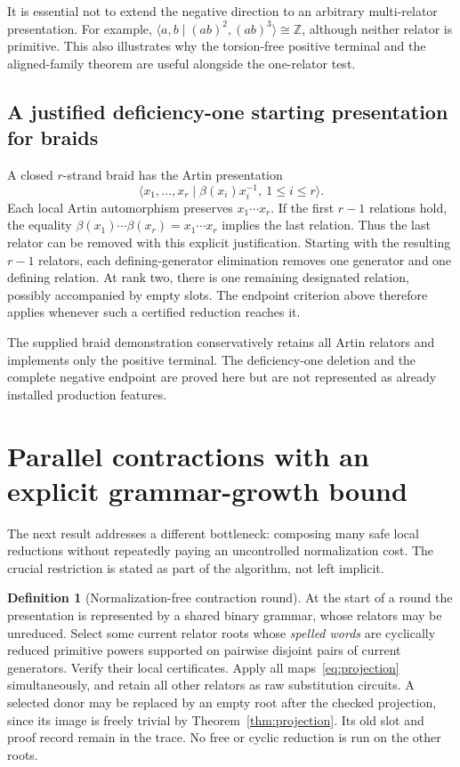 \documentclass[11pt,letterpaper]{article}
\theoremstyle{definition}
\newtheorem{definition}[theorem]{Definition}
\newcommand{\Z}{\mathbb Z}
\begin{document}
It is essential not to extend the negative direction to an arbitrary
multi-relator presentation. For example,
$\langle a,b\mid (ab)^2,(ab)^3\rangle\cong\Z$, although neither relator is
primitive. This also illustrates why the torsion-free positive terminal
and the aligned-family theorem are useful alongside the one-relator test.

\subsection{A justified deficiency-one starting presentation for braids}
A closed $r$-strand braid has the Artin presentation
\[
 \langle x_1,\ldots,x_r\mid \beta(x_i)x_i^{-1},\ 1\leq i\leq r\rangle.
\]
Each local Artin automorphism preserves $x_1\cdots x_r$. If the first $r-1$
relations hold, the equality
$\beta(x_1)\cdots\beta(x_r)=x_1\cdots x_r$ implies the last relation.
Thus the last relator can be removed with this explicit justification.
Starting with the resulting $r-1$ relators, each defining-generator
elimination removes one generator and one defining relation. At rank two,
there is one remaining designated relation, possibly accompanied by empty
slots. The endpoint criterion above therefore applies whenever such a
certified reduction reaches it.

The supplied braid demonstration conservatively retains all Artin relators
and implements only the positive terminal. The deficiency-one deletion and
the complete negative endpoint are proved here but are not represented as
already installed production features.

\section{Parallel contractions with an explicit grammar-growth bound}
\label{sec:rounds}
The next result addresses a different bottleneck: composing many safe local
reductions without repeatedly paying an uncontrolled normalization cost.
The crucial restriction is stated as part of the algorithm, not left implicit.

\begin{definition}[Normalization-free contraction round]
At the start of a round the presentation is represented by a shared binary
grammar, whose relators may be unreduced. Select some current relator roots
whose \emph{spelled words} are cyclically reduced primitive powers supported
on pairwise disjoint pairs of current generators. Verify their local
certificates. Apply all maps~\eqref{eq:projection} simultaneously, and retain
all other relators as raw substitution circuits. A selected donor may be
replaced by an empty root after the checked projection, since its image is
freely trivial by Theorem~\ref{thm:projection}. Its old slot and proof record
remain in the trace. No free or cyclic reduction is run on the other roots.
\end{definition}
\end{document}
